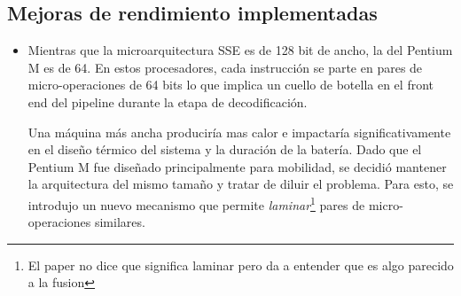 \subsection{Mejoras de rendimiento implementadas}
\begin{itemize}
	\item Mientras que la microarquitectura SSE es de 128 bit de ancho, la del Pentium M es de 64. En estos procesadores, cada instrucción se parte en pares de micro-operaciones de 64 bits lo que implica un cuello de botella en el front end del pipeline durante la etapa de decodificación.  
	
	Una máquina más ancha produciría mas calor e impactaría significativamente en el diseño térmico del sistema y la duración de la batería. Dado que el Pentium M fue diseñado principalmente para mobilidad, se decidió mantener la arquitectura del mismo tamaño y tratar de diluir el problema. Para esto, se introdujo un nuevo mecanismo que permite \textit{laminar}\footnote{El paper no dice que significa laminar pero da a entender que es algo parecido a la fusion} pares de micro-operaciones similares.
\end{itemize}